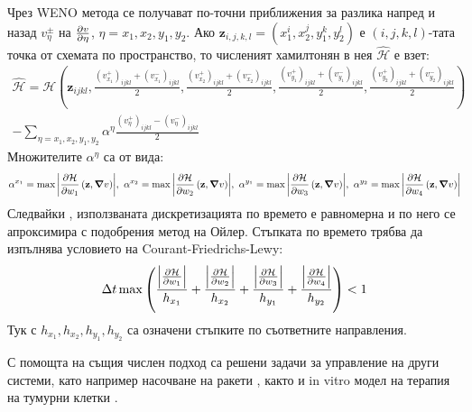 Чрез WENO метода се получават по-точни приближения за разлика напред и назад $v_{\eta}^{\pm}$ на $\pdv{v}{\eta}$, $\eta = x_1, x_2, y_1, y_2$.
Ако $\mathbf{z}_{i,j,k,l}=(x_1^i, x_2^j, y_1^k, y_2^l)$ е $(i,j,k,l)$-тата точка от схемата по пространство, то численият хамилтонян в нея $\hat{\mathcal{H}}$ е взет:
\begin{multline}
  \hat{\mathcal{H}} = \mathcal{H}\left(\mathbf{z}_{ijkl}, \frac{(v_{x_1}^+)_{ijkl}+(v_{x_1}^-)_{ijkl}}{2}, \frac{(v_{x_2}^+)_{ijkl}+(v_{x_2}^-)_{ijkl}}{2}, \frac{(v_{y_1}^+)_{ijkl}+(v_{y_1}^-)_{ijkl}}{2}, \frac{(v_{y_2}^+)_{ijkl}+(v_{y_2}^-)_{ijkl}}{2}\right) \\ - \sum_{\eta = x_1, x_2, y_1, y_2} \alpha^{\eta} \frac{(v_{\eta}^+)_{ijkl}-(v_{\eta}^-)_{ijkl}}{2}
\end{multline}
Множителите $\alpha^{\eta}$ са от вида:
\begin{equation}
  \alpha^{x_1} = \max \abs{\pdv{\mathcal{H}}{w_1}\left(\mathbf{z}, \grad{v}\right)},~
  \alpha^{x_2} = \max \abs{\pdv{\mathcal{H}}{w_2}\left(\mathbf{z}, \grad{v}\right)},~
  \alpha^{y_1} = \max \abs{\pdv{\mathcal{H}}{w_3}\left(\mathbf{z}, \grad{v}\right)},~
  \alpha^{y_2} = \max \abs{\pdv{\mathcal{H}}{w_4}\left(\mathbf{z}, \grad{v}\right)}
\end{equation}
Следвайки \cite[глава~3.5]{Osher2003}, използваната дискретизацията по времето е равномерна и по него се апроксимира с подобрения метод на Ойлер.
Стъпката по времето трябва да изпълнява условието на Courant-Friedrichs-Lewy:
\begin{equation}
  \Delta t \max \left(\frac{\abs{\pdv{\mathcal{H}}{w_1}}}{h_{x_1}} + \frac{\abs{\pdv{\mathcal{H}}{w_2}}}{h_{x_2}} + \frac{\abs{\pdv{\mathcal{H}}{w_3}}}{h_{y_1}} + \frac{\abs{\pdv{\mathcal{H}}{w_4}}}{h_{y_2}}\right) < 1
\end{equation}
Тук с $h_{x_1}, h_{x_2}, h_{y_1}, h_{y_2}$ са означени стъпките по съответните направления.

\begin{remark}
  С помощта на същия числен подход са решени задачи за управление на други системи, като например насочване на ракети \cite{Assellaou2016, Assellaou2018}, както и in vitro модел на терапия на тумурни клетки \cite{Carrere2020}.
\end{remark}
